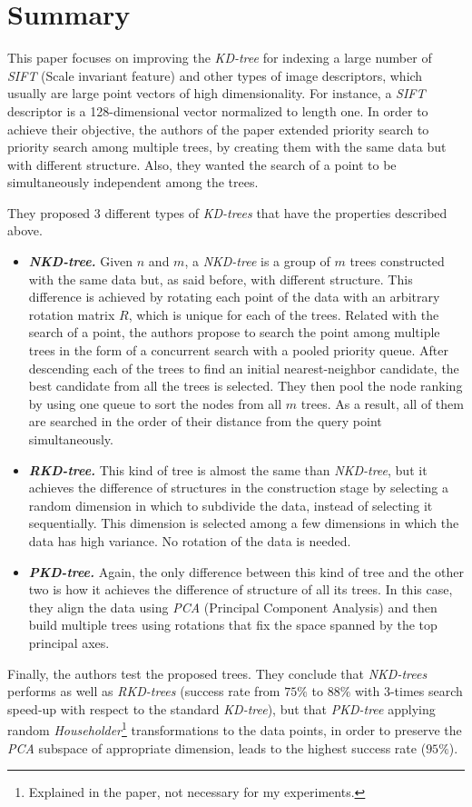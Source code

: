 \section{Summary}
\label{sec:summary}
This paper \cite{Hartley08r.:optimised} focuses on improving the \textit{KD-tree} for indexing a large number of \textit{SIFT} (Scale invariant feature) and other types of image descriptors, which usually are large point vectors of high dimensionality. For instance, a \textit{SIFT} descriptor is a 128-dimensional vector normalized to length one. In order to achieve their objective, the authors of the paper extended priority search to priority search among multiple trees, by creating them with the same data but with different structure. Also, they wanted the search of a point to be simultaneously independent among the trees.

They proposed 3 different types of \textit{KD-trees} that have the properties described above.
\begin{itemize}
    \item \textit{\textbf{NKD-tree.}} Given $n$ and $m$, a \textit{NKD-tree} is a group of $m$ trees constructed with the same data but, as said before, with different structure. This difference is achieved by rotating each point of the data with an arbitrary rotation matrix $R$, which is unique for each of the trees. Related with the search of a point, the authors propose to search the point among multiple trees in the form of a concurrent search with a pooled priority queue. After descending each of the trees to find an initial nearest-neighbor candidate, the best candidate from all the trees is selected. They then pool the node ranking by using one queue to sort the nodes from all $m$ trees. As a result, all of them are searched in the order of their distance from the query point simultaneously.
    \item \textit{\textbf{RKD-tree.}} This kind of tree is almost the same than \textit{NKD-tree}, but it achieves the difference of structures in the construction stage by selecting a random dimension in which to subdivide the data, instead of selecting it sequentially. This dimension is selected among a few dimensions in which the data has high variance. No rotation of the data is needed.
    \item \textit{\textbf{PKD-tree.}} Again, the only difference between this kind of tree and the other two is how it achieves the difference of structure of all its trees. In this case, they align the data using \textit{PCA} (Principal Component Analysis) and then build multiple trees using rotations that fix the space spanned by the top principal axes.
\end{itemize}

Finally, the authors test the proposed trees. They conclude that \textit{NKD-trees} performs as well as \textit{RKD-trees} (success rate from $75\%$ to $88\%$ with 3-times search speed-up with respect to the standard \textit{KD-tree}), but that \textit{PKD-tree} applying random \textit{Householder}\footnote{Explained in the paper, not necessary for my experiments.} transformations to the data points, in order to preserve the \textit{PCA} subspace of appropriate dimension, leads to the highest success rate ($95\%$).
